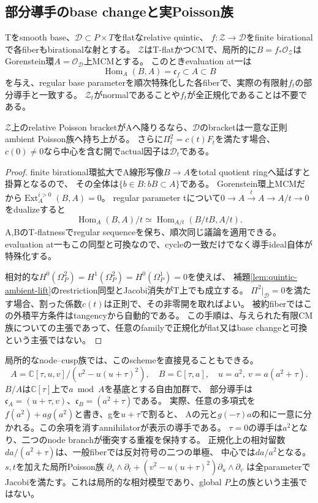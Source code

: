 \subsection{部分導手のbase changeと実Poisson族}
\begin{proposition}[有限CM族の導手と一意な相対lift]\label{prop:partial-conductor-family}
Tをsmooth base、$\mathcal D\subset P\times T$をflatなrelative quintic、
$f:\mathcal Z\to\mathcal D$をfinite birationalで各fiberもbirationalな射とする。
$\mathcal Z$はT-flatかつCMで、局所的に$B=f_*\mathcal O_{\mathcal Z}$は
Gorenstein環$A=\mathcal O_{\mathcal D}$上MCMとする。
このときevaluation at一は
\[
 \operatorname{Hom}_A(B,A)=\mathfrak c_f\subset A\subset B
\]
を与え、regular base parameterを順次特殊化した各fiberで、実際の有限射$f_t$の部分導手と一致する。
$\mathcal Z_t$がnormalであることや$f_t$が全正規化であることは不要である。

$\mathcal Z$上のrelative Poisson bracketがAへ降りるなら、$\mathcal D$のbracketは一意な正則ambient Poisson族へ持ち上がる。
さらに$\Pi_t^2=c(t)F_t$を満たす場合、$c(0)\ne0$なら中心を含む開でactual因子は$\mathcal D_t$である。
\end{proposition}
\begin{proof}
finite birational環拡大でA線形写像$B\to A$をtotal quotient ringへ延ばすと掛算となるので、
その全体は$\{b\in B:bB\subset A\}$である。
Gorenstein環上MCMだから$\operatorname{Ext}^{i>0}_A(B,A)=0$。
regular parameter tについて$0\to A\xrightarrow{t}A\to A/t\to0$をdualizeすると
\[
 \operatorname{Hom}_A(B,A)/t
 \simeq\operatorname{Hom}_{A/t}(B/tB,A/t).
\]
A,BのT-flatnessでregular sequenceを保ち、順次同じ議論を適用できる。
evaluation at一もこの同型と可換なので、cycleの一致だけでなく導手ideal自体が特殊化する。

相対的な$H^0(\Omega_P^2)=H^1(\Omega_P^2)=H^0(\Omega_P^1)=0$を使えば、
補題\ref{lem:quintic-ambient-lift}のrestriction同型とJacobi消失がT上でも成立する。
$\Pi^2|_{\mathcal D}=0$を満たす場合、割った係数$c(t)$は正則で、その非零開を取ればよい。
被約fiberではこの外積平方条件はtangencyから自動的である。
この手順は、与えられた有限CM族についての主張であって、任意のfamilyで正規化がflat又はbase changeと可換という主張ではない。
\end{proof}

局所的なnode--cusp族では、このschemeを直接見ることもできる。
\[
 A=\mathbb C[\tau,u,v]/(v^2-u(u+\tau)^2),\quad
 B=\mathbb C[\tau,a],\quad u=a^2,\ v=a(a^2+\tau).
\]
$B/A$は$\mathbb C[\tau]$上で$a\bmod A$を基底とする自由加群で、
部分導手は$\mathfrak c_A=(u+\tau,v)$、$\mathfrak c_B=(a^2+\tau)$である。
実際、任意の多項式を$f(a^2)+a g(a^2)$と書き、gを$u+\tau$で割ると、
Aの元と$g(-\tau)a$の和に一意に分かれる。この余項を消すannihilatorが表示の導手である。
$\tau=0$の導手は$a^2$となり、二つのnode branchが衝突する重複を保持する。
正規化上の相対留数$da/(a^2+\tau)$は、一般fiberでは反対符号の二つの単極、
中心では$da/a^2$となる。
$s,t$を加えた局所Poisson族
$\partial_s\wedge\partial_t+(v^2-u(u+\tau)^2)\partial_u\wedge\partial_v$
は全parameterでJacobiを満たす。これは局所的な相対模型であり、global $P$上の族という主張ではない。


